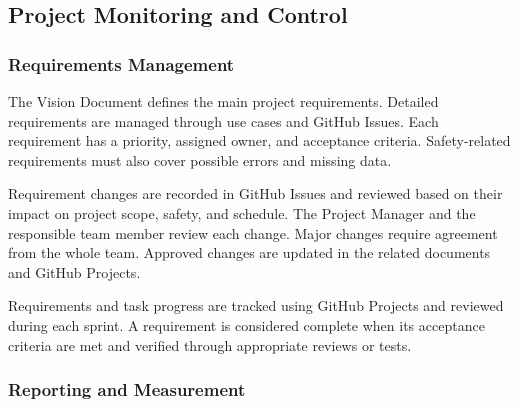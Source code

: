\subsection{Project Monitoring and Control}

\subsubsection{Requirements Management}

The Vision Document defines the main project requirements.
Detailed requirements are managed through use cases
and GitHub Issues. Each requirement has a priority,
assigned owner, and acceptance criteria.
Safety-related requirements must also cover possible
errors and missing data.


Requirement changes are recorded in GitHub Issues
and reviewed based on their impact on project scope,
safety, and schedule. The Project Manager and the
responsible team member review each change.
Major changes require agreement from the whole team.
Approved changes are updated in the related documents
and GitHub Projects.

Requirements and task progress are tracked using
GitHub Projects and reviewed during each sprint.
A requirement is considered complete when its
acceptance criteria are met and verified through
appropriate reviews or tests.

\subsubsection{Reporting and Measurement}


